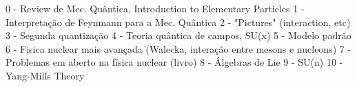 0 - Review de Mec. Quântica, Introduction to Elementary Particles
1 - Interpretação de Feynmann para a Mec. Quântica
2 - "Pictures" (interaction, etc)
3 - Segunda quantização
4 - Teoria quântica de campos, SU(x)
5 - Modelo padrão
6 - Fisica nuclear mais avançada (Walecka, interação entre mesons e nucleons)
7 - Problemas em aberto na física nuclear (livro)
8 - Álgebras de Lie
9 - SU(n)
10 - Yang-Mills Theory
